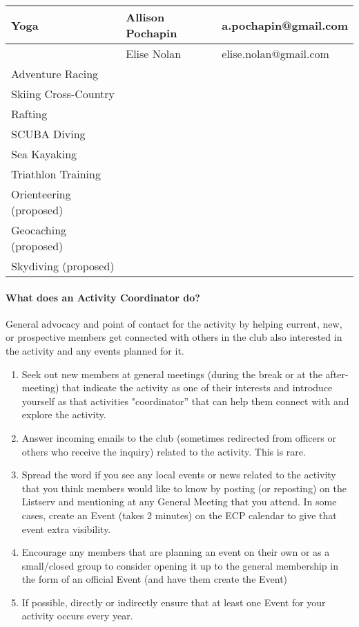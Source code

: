 \documentclass[10pt,a4paper]{article}
\begin{document}
\begin{center}
\begin{tabular}{ | l | l | l | }
	Yoga  &  Allison Pochapin & a.pochapin@gmail.com\\ \hline
            &  Elise Nolan & elise.nolan@gmail.com\\ \hline
	Adventure Racing & & \\ \hline
	Skiing  Cross-Country & & \\ \hline
	Rafting & & \\ \hline
	SCUBA Diving & & \\ \hline
	Sea Kayaking & & \\ \hline
	Triathlon Training & & \\ \hline
	Orienteering (proposed) & & \\ \hline
	Geocaching (proposed) & & \\ \hline
	Skydiving (proposed) & & \\ \hline
	 \hline
    \end{tabular}
\end{center}

\paragraph{What does an Activity Coordinator do?}
General advocacy and point of contact for the activity by helping current, new, or prospective members
get connected with others in the club also interested in the activity and any events planned for it.
\begin{enumerate}
\item Seek out new members at general meetings (during the break or at the after-meeting) that
indicate the activity as one of their interests and introduce yourself as that activities
"coordinator” that can help them connect with and explore the activity.
\item Answer incoming emails to the club (sometimes redirected from officers or others who receive
the inquiry) related to the activity. This is rare.
\item Spread the word if you see any local events or news related to the activity that you think
members would like to know by posting (or reposting) on the Listserv and mentioning at any
General Meeting that you attend. In some cases, create an Event (takes 2 minutes) on the ECP
calendar to give that event extra visibility.
\item Encourage any members that are planning an event on their own or as a small/closed group to
consider opening it up to the general membership in the form of an official Event (and have
them create the Event)
\item If possible, directly or indirectly ensure that at least one Event for your activity occurs every year.
\end{enumerate}
\end{document}

